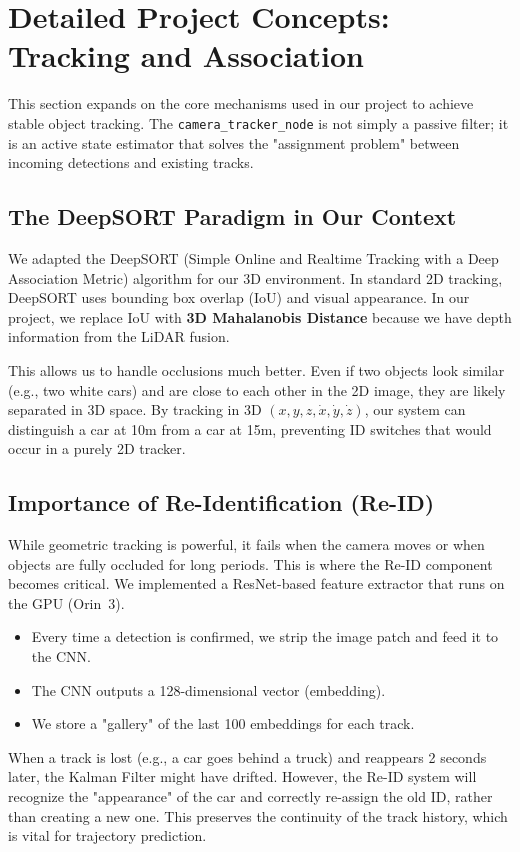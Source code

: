 \documentclass[12pt,a4paper]{report}
\begin{document}
\section{Detailed Project Concepts: Tracking and Association}
This section expands on the core mechanisms used in our project to achieve stable object tracking. The \texttt{camera\_tracker\_node} is not simply a passive filter; it is an active state estimator that solves the "assignment problem" between incoming detections and existing tracks.

\subsection{The DeepSORT Paradigm in Our Context}
We adapted the DeepSORT (Simple Online and Realtime Tracking with a Deep Association Metric) algorithm for our 3D environment. In standard 2D tracking, DeepSORT uses bounding box overlap (IoU) and visual appearance. In our project, we replace IoU with \textbf{3D Mahalanobis Distance} because we have depth information from the LiDAR fusion. 

This allows us to handle occlusions much better. Even if two objects look similar (e.g., two white cars) and are close to each other in the 2D image, they are likely separated in 3D space. By tracking in 3D $(x, y, z, \dot{x}, \dot{y}, \dot{z})$, our system can distinguish a car at 10m from a car at 15m, preventing ID switches that would occur in a purely 2D tracker.

\subsection{Importance of Re-Identification (Re-ID)}
While geometric tracking is powerful, it fails when the camera moves or when objects are fully occluded for long periods. This is where the Re-ID component becomes critical. We implemented a ResNet-based feature extractor that runs on the GPU (Orin~3). 
\begin{itemize}
    \item Every time a detection is confirmed, we strip the image patch and feed it to the CNN.
    \item The CNN outputs a 128-dimensional vector (embedding).
    \item We store a "gallery" of the last 100 embeddings for each track.
\end{itemize}
When a track is lost (e.g., a car goes behind a truck) and reappears 2 seconds later, the Kalman Filter might have drifted. However, the Re-ID system will recognize the "appearance" of the car and correctly re-assign the old ID, rather than creating a new one. This preserves the continuity of the track history, which is vital for trajectory prediction.
\end{document}
